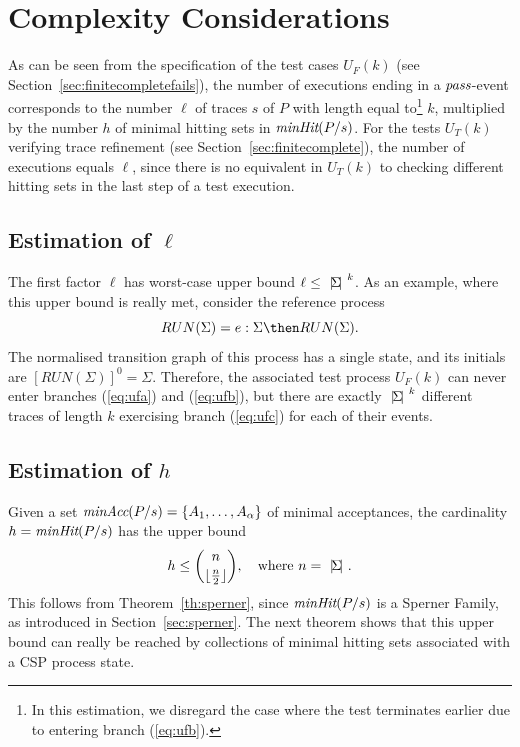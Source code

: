 \section{Complexity Considerations}
\label{sec:complexity}


 
As can be seen from the specification of the test cases $U_F(k)$ 
(see Section~\ref{sec:finitecompletefails}), the number of
executions ending in a ${\text{\it pass}}$-event corresponds to the number $\ell$ of traces $s$
of $P$ with length equal to\footnote{In this estimation, we disregard
the case where the test
terminates earlier due to entering branch (\ref{eq:ufb}).} $k$,
multiplied by the number $h$ of minimal hitting sets in
$\text{\it minHit}(P/s)$. For the tests $U_T(k)$ verifying trace refinement (see Section~\ref{sec:finitecomplete}), the number of executions equals $\ell$, since
there is no equivalent in $U_T(k)$ 
to checking different hitting sets in the last step of a 
test execution.



\subsection{Estimation of $\ell$}
The first factor $\ell$
has worst-case upper bound $\ell\le {~|\! \Sigma\!|~}^k$. As an example, where this upper bound 
is really met, consider the reference process
\[
RUN(\Sigma) = e:\Sigma \then RUN(\Sigma).
\]
The normalised transition graph of this process has a single state, and its initials
are $[RUN(\Sigma)]^0 = \Sigma$. Therefore, the associated test process $U_F(k)$ can 
never enter branches (\ref{eq:ufa}) and (\ref{eq:ufb}), but there are exactly 
${~|\! \Sigma\!|~}^k$ different traces of length $k$ exercising branch (\ref{eq:ufc})
for each of their events.

\subsection{Estimation of $h$}
Given a set $\text{\it minAcc}(P/s) = \{ A_1,\dots, A_\alpha \}$ of   minimal
acceptances, the cardinality   $h = \text{\it minHit}(P/s)$ has the upper bound
\[
h \le \binom{n}{\lfloor\frac{n}{2}\rfloor}, \quad \text{where $n = {~|\! \Sigma\!|~}$.}
\]
This follows from Theorem~\ref{th:sperner}, since $\text{\it minHit}(P/s)$ is a 
Sperner Family, as introduced in Section~\ref{sec:sperner}. 
The next theorem shows that this
upper bound can really be reached by collections of minimal hitting sets associated with 
a CSP process state.

